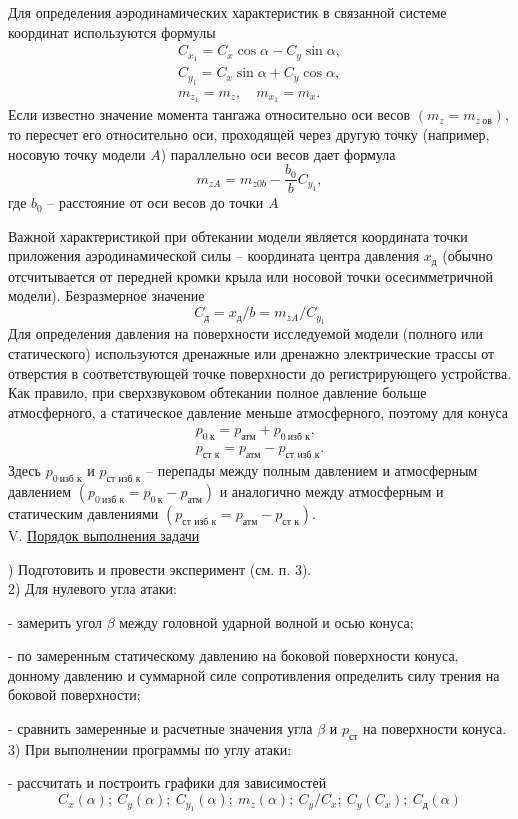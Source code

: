 \documentclass[specialist, subf, href, colorlinks=true, 14pt, final]{disser}
\theoremstyle{definition}
\newcommand{\npart}[2]{\noindent #1. \underline{#2}}
\begin{document}
Для определения аэродинамических характеристик в связанной системе координат используются формулы
\[
  \begin{array}{l}
    C_{x_1} = C_x \cos \alpha - C_y \sin \alpha,\\
    C_{y_1} = C_x \sin \alpha + C_y \cos \alpha, \\
    m_{z_1} = m_z, \quad m_{x_1} = m_x. 
  \end{array} 
\]
Если известно значение момента тангажа относительно оси весов $(m_z = m_{z\ \text{ов}})$, то пересчет его относительно оси, проходящей через другую точку (например, носовую точку модели $A$) параллельно оси весов дает формула
\[ m_{zA} = m_{z0b} - \frac{b_0}{b} C_{y_1}, \]
где $b_0$ -- расстояние от оси весов до точки $A$

Важной характеристикой при обтекании модели является координата точки приложения аэродинамической силы -- координата центра давления $x_{\text{д}}$ (обычно отсчитывается от передней кромки крыла или носовой точки осесимметричной модели). Безразмерное значение
\[ C_{\text{д}} = x_{\text{д}} / b = m_{zA}/C_{y_1}  \]
Для определения давления на поверхности исследуемой модели
(полного или статического) используются дренажные или дренажно электрические трассы от отверстия в соответствующей точке поверхности до регистрирующего устройства. Как правило, при сверхзвуковом обтекании полное давление больше атмосферного, а статическое давление меньше атмосферного, поэтому для конуса
\[
  \begin{aligned}
  p_{0\ \text{к}} = p_{\text{атм}} + p_{0\ \text{изб к}},\\
  p_{\text{ст к}} = p_{\text{атм}} - p_{\text{ст изб к}}.
  \end{aligned}
\]
Здесь $p_{0\ \text{изб к}}$ и $p_{\text{ст изб к}}$ -- перепады между полным давлением и атмосферным давлением $(p_{0\ \text{изб к}} = p_{0\ \text{к}} - p_{\text{атм}})$ и аналогично между атмосферным и статическим давлениями $(p_{\text{ст изб к}} = p_{\text{атм}} - p_{\text{ст к}})$.\\

\npart{V}{Порядок выполнения задачи}

) Подготовить и провести эксперимент (см. п. 3).\\
2) Для нулевого угла атаки:
\par - замерить угол $\beta$ между головной ударной волной и осью конуса;
\par - по замеренным статическому давлению на боковой поверхности конуса, донному давлению и суммарной силе сопротивления определить силу трения на боковой поверхности;
\par - сравнить замеренные и расчетные значения угла $\beta$ и $p_{\text{ст}}$ на поверхности конуса.\\
3) При выполнении программы по углу атаки:
\par - рассчитать и построить графики для зависимостей
\[
  C_{x}(\alpha);\ C_{y}(\alpha);\ C_{y_1}(\alpha);\ m_{z}(\alpha);\ C_{y}/C_{x};\ C_{y}(C_x);\ C_{\text{д}}(\alpha)
\]
\end{document}
